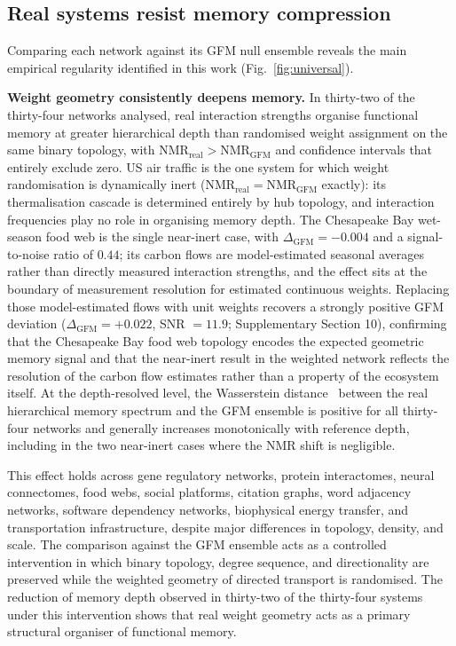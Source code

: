 \documentclass[aps,superscriptaddress,11pt]{revtex4-2}
\newcommand{\NMR}{\mathrm{NMR}}
\theoremstyle{definition}
\theoremstyle{plain}
\begin{document}
\subsection{Real systems resist memory compression}

Comparing each network against its GFM null ensemble reveals the main empirical regularity 
identified in this work (Fig.~\ref{fig:universal}).

\medskip
\noindent
\textbf{Weight geometry consistently deepens memory.}
In thirty-two of the thirty-four networks analysed, real interaction
strengths organise functional memory at greater hierarchical depth than
randomised weight assignment on the same binary topology, with
$\NMR_{\mathrm{real}} > \NMR_{\mathrm{GFM}}$ and confidence intervals
that entirely exclude zero. US air traffic is the one system for which
weight randomisation is dynamically inert ($\NMR_{\mathrm{real}} =
\NMR_{\mathrm{GFM}}$ exactly): its thermalisation cascade is determined entirely
by hub topology, and interaction frequencies play no role in organising
memory depth. The Chesapeake Bay wet-season food web is the single near-inert case, with 
$\Delta_{\mathrm{GFM}} = -0.004$ and a signal-to-noise ratio of $0.44$; its 
carbon flows are model-estimated seasonal averages~\cite{Baird1989} rather 
than directly measured interaction strengths, and the effect sits at the 
boundary of measurement resolution for estimated continuous weights. Replacing those
model-estimated flows with unit weights recovers a strongly positive GFM
deviation ($\Delta_{\mathrm{GFM}} = +0.022$, SNR $= 11.9$;
Supplementary Section 10), confirming that the
Chesapeake Bay food web topology encodes the expected geometric memory
signal and that the near-inert result in the weighted network reflects
the resolution of the carbon flow estimates rather than a property of
the ecosystem itself. At the
depth-resolved level, the Wasserstein distance~\cite{Villani2009} between
the real hierarchical memory spectrum and the GFM ensemble is positive for
all thirty-four networks and generally increases monotonically with
reference depth, including in the two near-inert cases where the NMR
shift is negligible.

This effect holds across gene regulatory networks, protein interactomes,
neural connectomes, food webs, social platforms, citation graphs, word
adjacency networks, software dependency networks, biophysical energy
transfer, and transportation infrastructure, despite major differences in
topology, density, and scale. The comparison against the GFM ensemble
acts as a controlled intervention in which binary topology, degree
sequence, and directionality are preserved while the weighted geometry of
directed transport is randomised. The reduction of memory depth observed
in thirty-two of the thirty-four systems under this intervention shows
that real weight geometry acts as a primary structural organiser of
functional memory.
\end{document}
